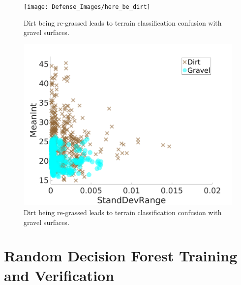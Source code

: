 \documentclass[numbered,pdftex]{ohio-etd}
\begin{document}
{{{		\begin{figure}[H]
			\centering
			\texttt{[image: Defense\_Images/here\_be\_dirt]}
			\caption[Re-grassed Dirt]{Dirt being re-grassed leads to terrain classification confusion with gravel surfaces.}
			\label{fig:here_be_dirt}
		\end{figure}
	
		\begin{figure}[H]
			\centering
			\includegraphics[width=0.65\linewidth]{Defense_Images/dirt_v_gravel2}
			\caption[Dirt vs Gravel]{Dirt being re-grassed leads to terrain classification confusion with gravel surfaces. }
			\label{fig:dirt_v_gravel2}
		\end{figure}
	
	} %
		
	
	\section{Random Decision Forest Training and Verification}\label{sec:rdf_train_verify}{
	
}}}
\end{document}
